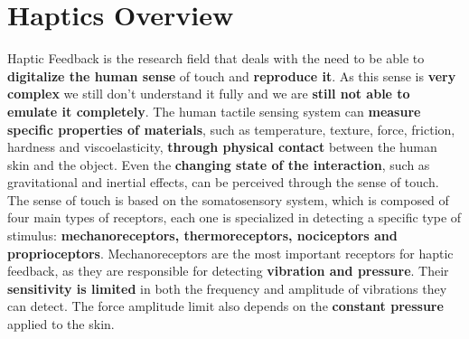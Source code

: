 \section{Haptics Overview}
Haptic Feedback is the research field that deals with the need to be able to \textbf{digitalize the human sense} of touch and \textbf{reproduce it}.
As this sense is \textbf{very complex} we still don’t understand it fully and we are \textbf{still not able to emulate it completely}. 
The human tactile sensing system can \textbf{measure specific properties of materials}, such as temperature, texture, force, friction, hardness and viscoelasticity, \textbf{through physical contact} between the human skin and the object.
Even the \textbf{changing state of the interaction}, such as gravitational and inertial effects, can be perceived through the sense of touch.
The sense of touch is based on the somatosensory system, which is composed of four main types of receptors, each one is specialized in detecting a specific type of stimulus: \textbf{mechanoreceptors, thermoreceptors, nociceptors and proprioceptors}.
Mechanoreceptors are the most important receptors for haptic feedback, as they are responsible for detecting \textbf{vibration and pressure}.
Their \textbf{sensitivity is limited} in both the frequency and amplitude of vibrations they can detect. The force amplitude limit also depends on the \textbf{constant pressure} applied to the skin.